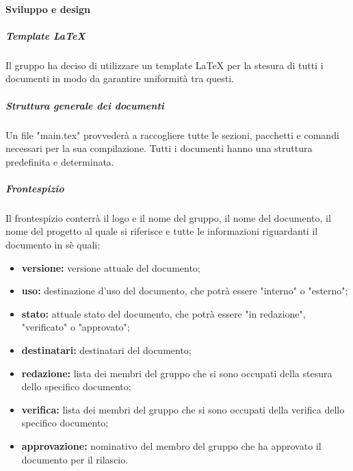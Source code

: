 			\paragraph{Sviluppo e design}
				\subparagraph{Template LaTeX}
					Il gruppo ha deciso di utilizzare un template LaTeX per la stesura di tutti i documenti in modo da garantire uniformità tra questi.	
				\subparagraph{Struttura generale dei documenti}		
					Un file "main.tex" provvederà a raccogliere tutte le sezioni, pacchetti e comandi necessari per la sua compilazione. Tutti i documenti hanno una struttura predefinita e determinata.
				\subparagraph{Frontespizio}	
					Il frontespizio conterrà il logo e il nome del gruppo, il nome del documento, il nome del progetto al quale si riferisce e tutte le informazioni riguardanti il documento in sè quali:
					\begin{itemize}
						\item \textbf{versione:} versione attuale del documento;
						\item \textbf{uso:} destinazione d'uso del documento, che potrà essere "interno" o "esterno";
						\item \textbf{stato:} attuale stato del documento, che potrà essere "in redazione", "verificato" o "approvato";
						\item \textbf{destinatari:} destinatari del documento;
						\item \textbf{redazione:} lista dei membri del gruppo che si sono occupati della stesura dello specifico documento;
						\item \textbf{verifica:} lista dei membri del gruppo che si sono occupati della verifica dello specifico documento;
						\item \textbf{approvazione:} nominativo del membro del gruppo che ha approvato il documento per il rilascio.
					\end{itemize}
					
